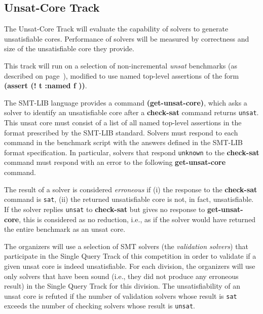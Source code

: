\documentclass[12pt]{article}
\newcommand{\akey}[1]{\textbf{#1}\xspace}
\newcommand{\maintrack}{Single Query Track\xspace}
\newcommand{\inctrack}{Incremental Track\xspace}
\newcommand{\ucoretrack}{Unsat-Core Track\xspace}
\begin{document}

\subsection{\ucoretrack}
\label{sec:exec:unsat-core}

The \ucoretrack will evaluate the capability of solvers to generate
unsatisfiable cores.  Performance of solvers will be measured by correctness
and size of the unsatisfiable core they provide.

This track will run on a selection of non-incremental \emph{unsat} benchmarks
(as described on page~\pageref{benchmark-selection}), modified
to use named top-level assertions of the form \akey{(assert (! t :named f ))}.


The SMT-LIB language provides a command \akey{(get-unsat-core)}, which asks
a solver to identify an unsatisfiable core after a \akey{check-sat}
command returns \texttt{unsat}.
This unsat core must consist of a list of all named top-level
assertions in the format prescribed by the SMT-LIB standard.
%
Solvers must respond to each command in the benchmark script with the
answers defined in the SMT-LIB format specification.  In particular,
solvers that respond \texttt{unknown} to the \akey{check-sat} command
must respond with an error to the following \akey{get-unsat-core}
command.

The result of a solver is considered \emph{erroneous} if (i) the
response to the \akey{check-sat} command is \texttt{sat}, (ii) the
returned unsatisfiable core is not, in fact, unsatisfiable.
%
If the solver replies \texttt{unsat} to \akey{check-sat} but gives no
response to \akey{get-unsat-core}, this is considered as no reduction, i.e.,
as if the solver would have returned the entire benchmark as an unsat
core.

The organizers will use a selection of SMT solvers (the \emph{validation
solvers}) that participate in the \maintrack of this competition in order to
validate if a given unsat core is indeed unsatisfiable.  For each division, the
organizers will use only solvers that have been sound (i.e., they did not
produce any erroneous result) in the \maintrack for this division.  The
unsatisfiability of an unsat core is refuted if the number of validation
solvers whose result is \texttt{sat} exceeds the number of checking solvers
whose result is \texttt{unsat}.
\end{document}
